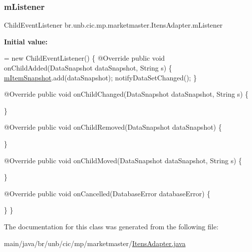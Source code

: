 \subsubsection{\texorpdfstring{m\+Listener}{mListener}}
{\footnotesize\ttfamily Child\+Event\+Listener br.\+unb.\+cic.\+mp.\+marketmaster.\+Itens\+Adapter.\+m\+Listener\hspace{0.3cm}{\ttfamily [private]}}

{\bfseries Initial value\+:}
\begin{DoxyCode}
= \textcolor{keyword}{new} ChildEventListener() \{
        @Override
        \textcolor{keyword}{public} \textcolor{keywordtype}{void} onChildAdded(DataSnapshot dataSnapshot, String s) \{
            \mbox{\hyperlink{classbr_1_1unb_1_1cic_1_1mp_1_1marketmaster_1_1ItensAdapter_a737ef683a4485f097f6d6ab16338c6e6}{mItemSnapshot}}.add(dataSnapshot);
            notifyDataSetChanged();
        \}

        @Override
        \textcolor{keyword}{public} \textcolor{keywordtype}{void} onChildChanged(DataSnapshot dataSnapshot, String s) \{

        \}

        @Override
        \textcolor{keyword}{public} \textcolor{keywordtype}{void} onChildRemoved(DataSnapshot dataSnapshot) \{

        \}

        @Override
        \textcolor{keyword}{public} \textcolor{keywordtype}{void} onChildMoved(DataSnapshot dataSnapshot, String s) \{

        \}

        @Override
        \textcolor{keyword}{public} \textcolor{keywordtype}{void} onCancelled(DatabaseError databaseError) \{

        \}
    \}
\end{DoxyCode}


The documentation for this class was generated from the following file\+:\begin{DoxyCompactItemize}
\item 
main/java/br/unb/cic/mp/marketmaster/\mbox{\hyperlink{ItensAdapter_8java}{Itens\+Adapter.\+java}}\end{DoxyCompactItemize}
